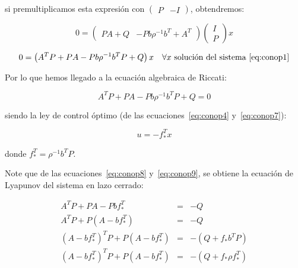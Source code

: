     si premultiplicamos esta expresión con $\begin{pmatrix} P & -I \end{pmatrix}$, obtendremos:

    \begin{equation*}
        0 =
        \begin{pmatrix}
            P A + Q & -P b \rho^{-1} b^T + A^T
        \end{pmatrix}
        \begin{pmatrix}
            I \\
            P
        \end{pmatrix} x
    \end{equation*}

    \begin{equation*}
        0 = \left( A^T P + P A - P b \rho^{-1} b^T P + Q \right) x \quad \forall x \text{ solución del sistema~\ref{eq:conop1}}
    \end{equation*}

    Por lo que hemos llegado a la ecuación algebraica de Riccati:

    \begin{equation} \label{eq:conop8}
        A^T P + P A - P b \rho^{-1} b^T P + Q = 0
    \end{equation}

    siendo la ley de control óptimo (de las ecuaciones~\ref{eq:conop4} y~\ref{eq:conop7}):

    \begin{equation} \label{eq:conop9}
        u = -f_*^T x
    \end{equation}

    donde $f_*^T = \rho^{-1} b^T P$.

    Note que de las ecuaciones~\ref{eq:conop8} y~\ref{eq:conop9}, se obtiene la ecuación de Lyapunov del sistema en lazo cerrado:

    \begin{eqnarray}
        A^T P + P A - P b f_*^T & = & -Q \nonumber \\
        A^T P + P \left( A - b f_*^T \right) & = & - Q \nonumber \\
        \left( A - b f_*^T \right)^T P + P \left( A - b f_*^T \right) & = & - \left( Q + f_* b^T P \right) \nonumber \\
        \left( A - b f_*^T \right)^T P + P \left( A - b f_*^T \right) & = & - \left( Q + f_* \rho f_*^T \right)
    \end{eqnarray}


